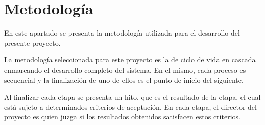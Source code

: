 \section{Metodología}

    \par
    En este apartado se presenta la metodología utilizada para el desarrollo del presente proyecto.
    \par La metodología seleccionada para este proyecto es la de ciclo de vida en cascada enmarcando el desarrollo completo del sistema. En el mismo, cada proceso es secuencial y la finalización de uno de ellos es el punto de inicio del siguiente.
    
    \par Al finalizar cada etapa se presenta un hito, que es el resultado de la etapa, el cual está sujeto a determinados criterios de aceptación. En cada etapa, el director del proyecto es quien juzga si los resultados obtenidos satisfacen estos criterios.

